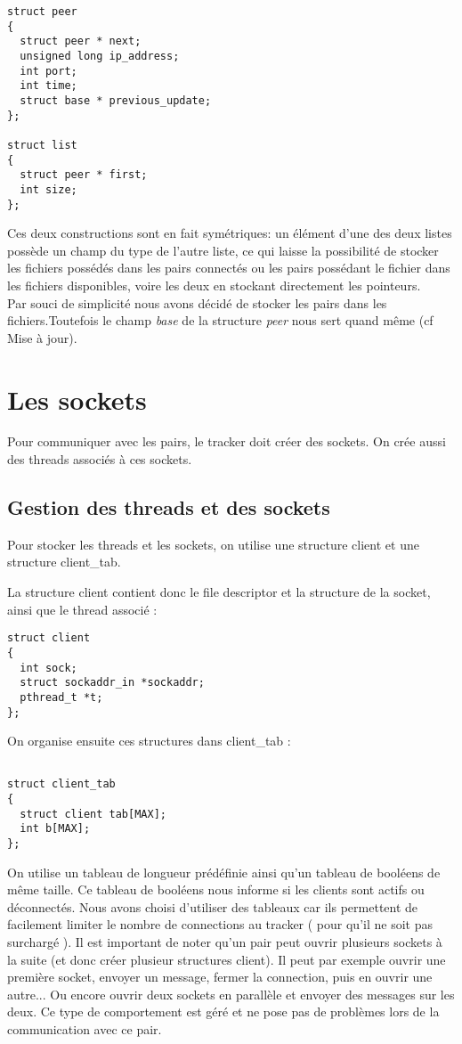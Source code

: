 \begin{verbatim}
struct peer
{
  struct peer * next;
  unsigned long ip_address;
  int port;
  int time;
  struct base * previous_update;
};

struct list
{
  struct peer * first;
  int size;
};
\end{verbatim}

Ces deux constructions sont en fait symétriques: un élément d'une des deux listes possède un champ du type de l'autre liste, ce qui laisse la possibilité de stocker les fichiers possédés dans les pairs connectés ou les pairs possédant le fichier dans les fichiers disponibles, voire les deux en stockant directement les pointeurs.\\ 
Par souci de simplicité nous avons décidé de stocker les pairs dans les fichiers.Toutefois le champ \textit{base} de la structure \textit{peer} nous sert quand même (cf Mise à jour).


\section{Les sockets}

Pour communiquer avec les pairs, le tracker doit créer des sockets. On crée aussi des threads associés à ces sockets.
\subsection{Gestion des threads et des sockets}
Pour stocker les threads et les sockets, on utilise une structure client et une structure client\_tab.

La structure client contient donc le file descriptor et la structure de la socket, ainsi que le thread associé :
\begin{verbatim}
struct client
{
  int sock;
  struct sockaddr_in *sockaddr;
  pthread_t *t; 
};
\end{verbatim}
On organise ensuite ces structures dans client\_tab :
\begin{verbatim}

struct client_tab
{
  struct client tab[MAX];
  int b[MAX];
};
\end{verbatim}
On utilise un tableau de longueur prédéfinie ainsi qu'un tableau de booléens de même taille. Ce tableau de booléens nous informe si les clients sont actifs ou déconnectés.
Nous avons choisi d'utiliser des tableaux car ils permettent de facilement limiter le nombre de connections au tracker ( pour qu'il ne soit pas surchargé ). Il est important de noter qu'un pair peut ouvrir plusieurs sockets à la suite (et donc créer plusieur structures client). Il peut par exemple ouvrir une première socket, envoyer un message, fermer la connection, puis en ouvrir une autre... Ou encore ouvrir deux sockets en parallèle et envoyer des messages sur les deux. Ce type de comportement est géré et ne pose pas de problèmes lors de la communication avec ce pair.

